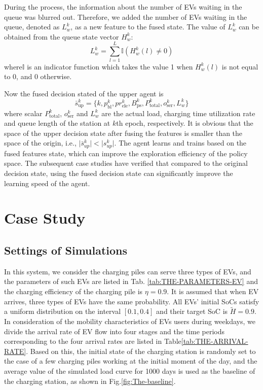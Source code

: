 \documentclass[preprint,12pt]{elsarticle}
\begin{document}
During the process, the information about the number of EVs waiting in the queue was blurred out. Therefore, we added the number of EVs waiting in the queue, denoted as $L_{w}^{k}$, as a new feature
to the fused state. The value of $L_{w}^{k}$ can be obtained from the queue state vector $H_{w}^{k}$:
\begin{equation}
L_{w}^{k}=\sum_{l=1}^{L}\mathbb{I}(H_{w}^{k}(l)\neq0)
\end{equation}
where$\mathbb{I}$ is an indicator function which takes the value 1 when $H_{w}^{k}(l)$ is not equal to 0, and 0 otherwise.

Now the fused decision stated of the upper agent is
\begin{equation}
\bar{s}_{\textrm{up}}^{k}=\biggl\{ k,p_{\textrm{bl}}^{k},pr_{\textrm{ele}}^{k},B_{\textrm{ps}}^{k},P_{\textrm{total}}^{k},o_{\textrm{ser}}^{k},L_{w}^{k}\biggr\}
\end{equation}
where scalar $P_{\textrm{total}}^{k}$, $o_{\textrm{ser}}^{k}$ and $L_{w}^{k}$ are the actual load, charging time utilization rate and queue length of the station at $k$th epoch, respectively. It is obvious that the space of the upper decision state after fusing the features is smaller than the space of the origin, i.e., $\biggl|\bar{s}_{up}^{k}\biggr|<\biggl|s_{up}^{k}\biggr|$.
The agent learns and trains based on the fused features state, which can improve the exploration efficiency of the policy space. The subsequent case studies have verified that compared to the original decision state, using the fused decision state can significantly improve the learning speed of the agent.

\section{Case Study}
\subsection{Settings of Simulations}

In this system, we consider the charging piles can serve three types
of EVs, and the parameters of such EVs are listed in Tab. \ref{tab:THE-PARAMETERS-EV}  and the charging efficiency of the charging pile is $\eta=0.9$. It is assumed that when EV arrives, three types of EVs  have the same probability. All EVs' initial SoCs satisfy a uniform distribution on the interval $[0.1,0.4]$ and their target SoC is $\tilde{H}=0.9$. In consideration of the mobility characteristics of EVs users during weekdays, we divide the
arrival rate of EV flow into four stages and the time periods corresponding to the four arrival rates are listed in Table\ref{tab:THE-ARRIVAL-RATE}. Based on this, the initial state of the charging station is randomly set to the case of a few charging piles working at the initial moment of the day, and the average value of the simulated load curve for 1000 days is used as the baseline of the charging station, as shown
in Fig.\ref{fig:The-baseline}.
\end{document}
